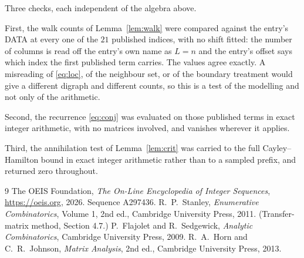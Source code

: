 \documentclass[11pt,a4paper]{article}
\theoremstyle{plain}
\theoremstyle{definition}
\begin{document}
Three checks, each independent of the algebra above.

First, the walk counts of Lemma~\ref{lem:walk} were compared against the entry's DATA at
every one of the $21$ published indices, with no shift fitted: the number of columns is
read off the entry's own name as $L=n$ and the entry's offset says which index the first
published term carries. The values agree exactly. A misreading of \eqref{eq:loc}, of the
neighbour set, or of the boundary treatment would give a different digraph and different
counts, so this is a test of the modelling and not only of the arithmetic.

Second, the recurrence \eqref{eq:conj} was evaluated on those published terms in exact
integer arithmetic, with no matrices involved, and vanishes wherever it applies.

Third, the annihilation test of Lemma~\ref{lem:crit} was carried to the full
Cayley--Hamilton bound in exact integer arithmetic rather than to a sampled prefix, and
returned zero throughout.

\begin{thebibliography}{9}
 The OEIS Foundation, \emph{The On-Line Encyclopedia of Integer
Sequences}, \url{https://oeis.org}, 2026. Sequence A297436.
 R.~P.~Stanley, \emph{Enumerative Combinatorics}, Volume 1, 2nd ed.,
Cambridge University Press, 2011. (Transfer-matrix method, Section 4.7.)
 P.~Flajolet and R.~Sedgewick, \emph{Analytic Combinatorics}, Cambridge
University Press, 2009.
 R.~A.~Horn and C.~R.~Johnson, \emph{Matrix Analysis}, 2nd ed., Cambridge
University Press, 2013.
\end{thebibliography}
\end{document}
